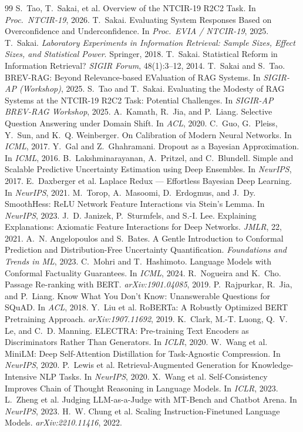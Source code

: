 \documentclass[sigconf,nonacm]{acmart}
\begin{document}
\begin{thebibliography}{99}
 S.~Tao, T.~Sakai, et al. Overview of the NTCIR-19 R2C2 Task. In {\em Proc.\ NTCIR-19}, 2026.
 T.~Sakai. Evaluating System Responses Based on Overconfidence and Underconfidence. In {\em Proc.\ EVIA / NTCIR-19}, 2025.
 T.~Sakai. {\em Laboratory Experiments in Information Retrieval: Sample Sizes, Effect Sizes, and Statistical Power}. Springer, 2018.
 T.~Sakai. Statistical Reform in Information Retrieval? {\em SIGIR Forum}, 48(1):3--12, 2014.
 T.~Sakai and S.~Tao. BREV-RAG: Beyond Relevance-based EValuation of RAG Systems. In {\em SIGIR-AP (Workshop)}, 2025.
 S.~Tao and T.~Sakai. Evaluating the Modesty of RAG Systems at the NTCIR-19 R2C2 Task: Potential Challenges. In {\em SIGIR-AP BREV-RAG Workshop}, 2025.
 A.~Kamath, R.~Jia, and P.~Liang. Selective Question Answering under Domain Shift. In {\em ACL}, 2020.
 C.~Guo, G.~Pleiss, Y.~Sun, and K.~Q. Weinberger. On Calibration of Modern Neural Networks. In {\em ICML}, 2017.
 Y.~Gal and Z.~Ghahramani. Dropout as a Bayesian Approximation. In {\em ICML}, 2016.
 B.~Lakshminarayanan, A.~Pritzel, and C.~Blundell. Simple and Scalable Predictive Uncertainty Estimation using Deep Ensembles. In {\em NeurIPS}, 2017.
 E.~Daxberger et al. Laplace Redux --- Effortless Bayesian Deep Learning. In {\em NeurIPS}, 2021.
 M.~Torop, A.~Masoomi, D.~Erdogmus, and J.~Dy. SmoothHess: ReLU Network Feature Interactions via Stein's Lemma. In {\em NeurIPS}, 2023.
 J.~D. Janizek, P.~Sturmfels, and S.-I. Lee. Explaining Explanations: Axiomatic Feature Interactions for Deep Networks. {\em JMLR}, 22, 2021.
 A.~N. Angelopoulos and S.~Bates. A Gentle Introduction to Conformal Prediction and Distribution-Free Uncertainty Quantification. {\em Foundations and Trends in ML}, 2023.
 C.~Mohri and T.~Hashimoto. Language Models with Conformal Factuality Guarantees. In {\em ICML}, 2024.
 R.~Nogueira and K.~Cho. Passage Re-ranking with BERT. {\em arXiv:1901.04085}, 2019.
 P.~Rajpurkar, R.~Jia, and P.~Liang. Know What You Don't Know: Unanswerable Questions for SQuAD. In {\em ACL}, 2018.
 Y.~Liu et al. RoBERTa: A Robustly Optimized BERT Pretraining Approach. {\em arXiv:1907.11692}, 2019.
 K.~Clark, M.-T. Luong, Q.~V. Le, and C.~D. Manning. ELECTRA: Pre-training Text Encoders as Discriminators Rather Than Generators. In {\em ICLR}, 2020.
 W.~Wang et al. MiniLM: Deep Self-Attention Distillation for Task-Agnostic Compression. In {\em NeurIPS}, 2020.
 P.~Lewis et al. Retrieval-Augmented Generation for Knowledge-Intensive NLP Tasks. In {\em NeurIPS}, 2020.
 X.~Wang et al. Self-Consistency Improves Chain of Thought Reasoning in Language Models. In {\em ICLR}, 2023.
 L.~Zheng et al. Judging LLM-as-a-Judge with MT-Bench and Chatbot Arena. In {\em NeurIPS}, 2023.
 H.~W. Chung et al. Scaling Instruction-Finetuned Language Models. {\em arXiv:2210.11416}, 2022.
\end{thebibliography}
\end{document}
